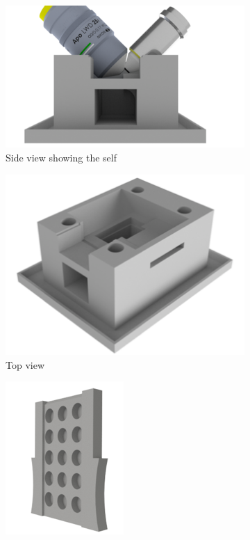 \begin{figure}
    \centering
    \begin{subfigure}[b]{\linewidth}
         \centering
        \includegraphics{./chamber_side}
         \caption{Side view showing the self}
         \label{fig:chamber_side}
    \end{subfigure}
    \begin{subfigure}[b]{0.4\linewidth}
             \centering
        \includegraphics{./chamber_top}
         \caption{Top view}
         \label{fig:chamber_top}
    \end{subfigure}
    \begin{subfigure}[b]{0.4\linewidth}
             \centering
        \includegraphics{./chamber_slide}

\end{subfigure}
\end{figure}
